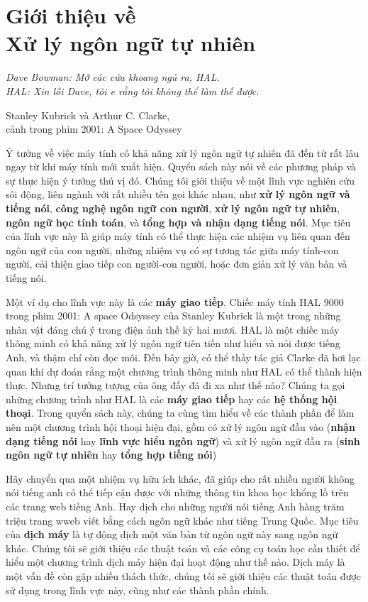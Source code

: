 \setcounter{chapter}{0}

\chapter{Giới thiệu về\\ Xử lý ngôn ngữ tự nhiên}

\setlength{}
\epigraphfontsize{\small}
\epigraph{
\itshape Dave Bowman: Mở các cửa khoang ngủ ra, HAL.\\
HAL: Xin lỗi Dave, tôi e rằng tôi không thể làm thế được.\\
}{Stanley Kubrick và Arthur C. Clarke,\\
cảnh trong phim 2001: A Space Odyssey}

Ý tưởng về việc máy tính có khả năng xử lý ngôn ngữ tự nhiên đã đến từ rất lâu ngay từ khi máy tính mới xuất hiện. Quyển sách này nói về các phương pháp và sự thực hiện ý tưởng thú vị đó. Chúng tôi giới thiệu về một lĩnh vực nghiên cứu sôi động, liên ngành với rất nhiều tên gọi khác nhau, như \textbf{xử lý ngôn ngữ và tiếng nói}, \textbf{công nghệ ngôn ngữ con người}, \textbf{xử lý ngôn ngữ tự nhiên}, \textbf{ngôn ngữ học tính toán}, và \textbf{tổng hợp và nhận dạng tiếng nói}. Mục tiêu của lĩnh vực này là giúp máy tính có thể thực hiện các nhiệm vụ liên quan đến ngôn ngữ của con người, những nhiệm vụ có sự tương tác giữa máy tính-con người, cải thiện giao tiếp con người-con người, hoặc đơn giản xử lý văn bản và tiếng nói.

Một ví dụ cho lĩnh vực này là các \textbf{máy giao tiếp}. Chiếc máy tính HAL 9000 trong phim 2001: A space Odsyssey của Stanley Kubrick là một trong những nhân vật đáng chú ý trong điện ảnh thế kỷ hai mươi. HAL là một chiếc máy thông minh có khả năng xử lý ngôn ngữ tiên tiến như hiểu và nói được tiếng Anh, và thậm chí còn đọc môi. Đến bây giờ, có thể thấy tác giả Clarke đã hơi lạc quan khi dự đoán rằng một chương trình thông minh như HAL có thể thành hiện thực. Nhưng trí tưởng tượng của ông đấy đã đi xa như thế nào? Chúng ta gọi những chương trình như HAL là các \textbf{máy giao tiếp} hay các \textbf{hệ thống hội thoại}. Trong quyển sách này, chúng ta cùng tìm hiểu về các thành phần để làm nên một chương trình hội thoại hiện đại, gồm có xử lý ngôn ngữ đầu vào (\textbf{nhận dạng tiếng nói} hay \textbf{lĩnh vực hiểu ngôn ngữ}) và xử lý ngôn ngữ đầu ra (\textbf{sinh ngôn ngữ tự nhiên} hay \textbf{tổng hợp tiếng nói})

Hãy chuyển qua một nhiệm vụ hữu ích khác, đã giúp cho rất nhiều người không nói tiếng anh có thể tiếp cận được với những thông tin khoa học khổng lồ trên các trang web tiếng Anh. Hay dịch cho những người nói tiếng Anh hàng trăm triệu trang wweb viết bằng cách ngôn ngữ khác như tiếng Trung Quốc. Mục tiêu của \textbf{dịch máy} là tự động dịch một văn bản từ ngôn ngữ này sang ngôn ngữ khác. Chúng tôi sẽ giới thiệu các thuật toán  và các công cụ toán học cần thiết để hiểu một chương trình dịch máy hiện đại hoạt động như thế nào. Dịch máy là một vấn đề còn gặp nhiều thách thức, chúng tôi sẽ giới thiệu các thuật toán được sử dụng trong lĩnh vực này, cũng như các thành phần chính.

